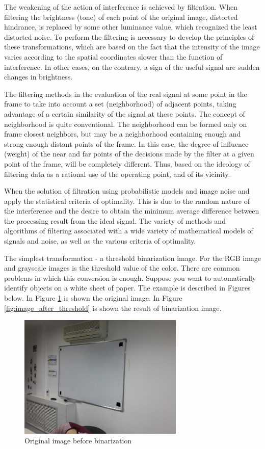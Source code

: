 The weakening of the action of interference is achieved by filtration. When filtering the brightness (tone) of each point of the original image, distorted hindrance, is replaced by some other luminance value, which recognized the least distorted noise. To perform the filtering is necessary to develop the principles of these transformations, which are based on the fact that the intensity of the image varies according to the spatial coordinates slower than the function of interference. In other cases, on the contrary, a sign of the useful signal are sudden changes in brightness.

The filtering methods in the evaluation of the real signal at some point in the frame to take into account a set (neighborhood) of adjacent points, taking advantage of a certain similarity of the signal at these points. The concept of neighborhood is quite conventional. The neighborhood can be formed only on frame closest neighbors, but may be a neighborhood containing enough and strong enough distant points of the frame. In this case, the degree of influence (weight) of the near and far points of the decisions made by the filter at a given point of the frame, will be completely different. Thus, based on the ideology of filtering data as a rational use of the operating point, and of its vicinity.

When the solution of filtration using probabilistic models and image noise and apply the statistical criteria of optimality. This is due to the random nature of the interference and the desire to obtain the minimum average difference between the processing result from the ideal signal. The variety of methods and algorithms of filtering associated with a wide variety of mathematical models of signals and noise, as well as the various criteria of optimality.

The simplest transformation - a threshold binarization image. For the RGB image and grayscale images is the threshold value of the color. There are common problems in which this conversion is enough. Suppose you want to automatically identify objects on a white sheet of paper. The example is described in Figures below. In Figure \ref{fig:original_for_threshold} is shown the original image. In Figure \ref{fig:image_after_threshold} is shown the result of binarization image.

\begin{figure}[h]
    \centering
    \includegraphics[width=0.7\textwidth]{Figures/original_for_threshold}
    \caption{Original image before binarization}
    \label{fig:original_for_threshold}
\end{figure}

